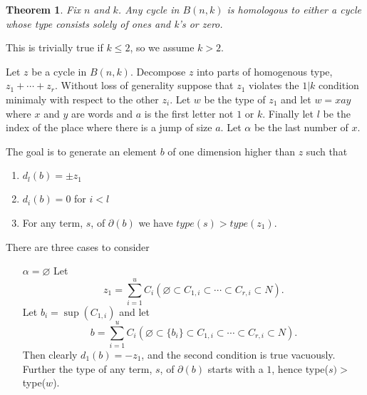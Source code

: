 \documentclass{elsart}
\newtheorem{theorem}{Theorem}[section]
\begin{document}
  \begin{theorem} Fix $n$ and $k$. Any cycle in $B(n, k)$ is homologous to either a cycle whose type consists solely of ones and
    k's or zero.
  \end{theorem}
  \begin{pf} 
    This is trivially true if $k \le 2$, so we assume $k > 2$.

Let $z$ be a cycle in $B(n, k)$. Decompose $z$ into parts of homogenous type, $z_1 + \cdots + z_r$. 
    Without loss of generality suppose that $z_1$ violates the $1|k$ condition minimaly with respect to the other $z_i$.
    Let $w$ be the type of $z_1$ and let $w = xay$ where $x$ and $y$ are words and $a$ is the first letter not 
    $1$ or $k$. Finally let $l$ be the index of the place where there is a jump of size $a$. Let $\alpha$ be the last
    number of $x$.

    The goal is to generate an element $b$ of one dimension higher than $z$ such that 
    \begin{enumerate}
      \item $d_{l} (b) = \pm z_1$
      \item $d_i (b) = 0$ for $i < l$
      \item For any term, $s$,  of $\partial(b)$ we have $type(s) > type(z_1)$.
    \end{enumerate}
    There are three cases to consider   
    \begin{enumerate}
      \item[$\alpha=\varnothing$]
        Let $$z_1 = \sum_{i=1}^u C_i (\varnothing \subset C_{1,i} \subset \cdots \subset C_{r,i} \subset 
        N).$$ Let $b_i =\sup(C_{1,i})$
        and let $$b = \sum_{i=1}^u C_i (\varnothing \subset \{b_i\} \subset C_{1,i} \subset 
        \cdots \subset C_{r,i} \subset N).$$ Then clearly $d_1(b) = -z_1$, and the second condition is true
        vacuously. Further the type of any term, $s$,  of $\partial(b)$ starts with a $1$, hence type($s) >$ type($w$).
   

\end{enumerate}
\end{pf}
\end{document}
